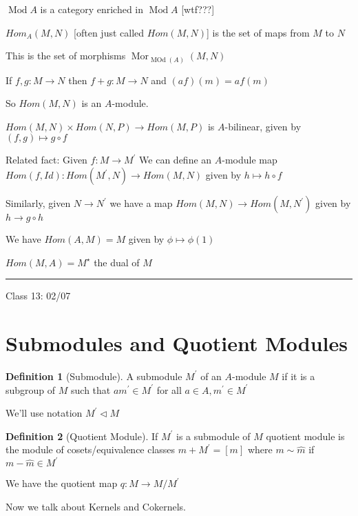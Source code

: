 \documentclass{article}
\theoremstyle{definition}
\newtheorem{definition}{Definition}
\begin{document}
\(\operatorname{Mod} A \) is a category enriched in \(\operatorname{Mod} A \) [wtf???]

\(Hom_A(M,N)\) [often just called \(Hom(M,N)\)] is the set of maps from \(M\) to \(N\)

This is the set of morphisms \(\operatorname{Mor}_{\operatorname{MOd}(A)}(M,N)  \) 

If \(f,g:M\to N\) then \(f+g:M\to N\) and \((af)(m)=af(m)\) 

So \(Hom(M,N)\) is an \(A\)-module.

\(Hom(M,N)\times Hom(N,P)\to Hom(M,P)\) is \(A\)-bilinear, given by \((f,g)\mapsto g\circ f\) 

Related fact: Given \(f:M\to M^{\prime}\)  We can define an \(A\)-module map \(Hom(f,Id):Hom(M^{\prime} ,N)\to Hom(M,N)\) given by \(h \mapsto h\circ f\) 

Similarly, given \(N\to N^{\prime}\) we have a map \(Hom(M,N)\to Hom(M,N^{\prime})\) given by \(h\to g\circ h\) 

We have \(Hom(A,M)=M\) given by \(\phi \mapsto \phi(1)\) 

\(Hom(M,A)=M^{\star} \) the dual of \(M\)

\hfil
\hrule

Class 13: 02/07

\section*{Submodules and Quotient Modules}

\begin{definition}
    [Submodule]

    A submodule \(M^{\prime} \) of an  \(A\)-module \(M\) if it is a subgroup of \(M\) such that \(am^{\prime} \in M^{\prime} \) for all \(a\in A,m^{\prime} \in M^{\prime} \) 
\end{definition}

We'll use notation \(M^{\prime} \triangleleft M\) 

\begin{definition}
    [Quotient Module]

    If \(M^{\prime} \) is a submodule of \(M\) quotient module is the module of cosets/equivalence classes \(m+M^{\prime}=[m]\) where \(m \sim \hat{m} \) if \(m - \hat{m} \in M^{\prime} \) 
\end{definition}

We have the quotient map \(q : M \to M / M^{\prime} \) 

Now we talk about Kernels and Cokernels.
\end{document}
